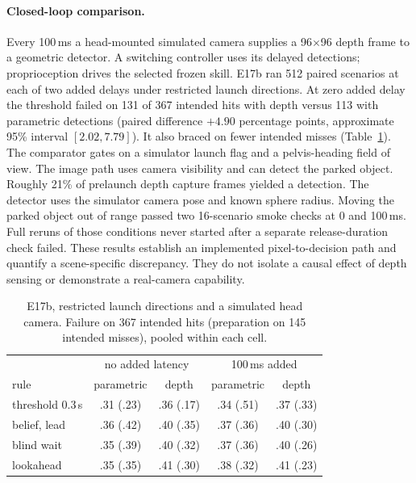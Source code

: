 \documentclass[10pt,twocolumn]{article}
\begin{document}
\paragraph{Closed-loop comparison.}
Every 100\,ms a head-mounted simulated camera supplies a 96$\times$96 depth frame to a geometric detector. A switching controller uses its delayed detections; proprioception drives the selected frozen skill. E17b ran 512 paired scenarios at each of two added delays under restricted launch directions. At zero added delay the threshold failed on 131 of 367 intended hits with depth versus 113 with parametric detections (paired difference $+4.90$ percentage points, approximate 95\% interval $[2.02,7.79]$). It also braced on fewer intended misses (Table~\ref{tab:depth}). The comparator gates on a simulator launch flag and a pelvis-heading field of view. The image path uses camera visibility and can detect the parked object. Roughly 21\% of prelaunch depth capture frames yielded a detection. The detector uses the simulator camera pose and known sphere radius. Moving the parked object out of range passed two 16-scenario smoke checks at 0 and 100\,ms. Full reruns of those conditions never started after a separate release-duration check failed. These results establish an implemented pixel-to-decision path and quantify a scene-specific discrepancy. They do not isolate a causal effect of depth sensing or demonstrate a real-camera capability.

\begin{table}[t]\centering\footnotesize\setlength{\tabcolsep}{3pt}
\caption{E17b, restricted launch directions and a simulated head camera. Failure on 367 intended hits (preparation on 145 intended misses), pooled within each cell.}\label{tab:depth}
\begin{tabular}{lcccc}\toprule
 & \multicolumn{2}{c}{no added latency} & \multicolumn{2}{c}{100\,ms added} \\
rule & parametric & depth & parametric & depth \\\midrule
threshold 0.3\,s & .31 (.23) & .36 (.17) & .34 (.51) & .37 (.33) \\
belief, lead & .36 (.42) & .40 (.35) & .37 (.36) & .40 (.30) \\
blind wait & .35 (.39) & .40 (.32) & .37 (.36) & .40 (.26) \\
lookahead & .35 (.35) & .41 (.30) & .38 (.32) & .41 (.23) \\\bottomrule
\end{tabular}
\end{table}
\end{document}
